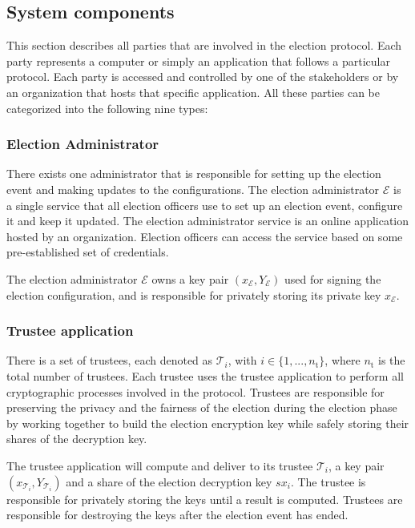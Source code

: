\subsection{System components} \label{sec: system components}
This section describes all parties that are involved in the election protocol. Each party represents a computer or simply an application that follows a particular protocol. Each party is accessed and controlled by one of the stakeholders or by an organization that hosts that specific application. All these parties can be categorized into the following nine types: 


\subsubsection{Election Administrator}
There exists one administrator that is responsible for setting up the election event and making updates to the configurations. The election administrator $\mathcal{E}$ is a single service that all election officers use to set up an election event, configure it and keep it updated. The election administrator service is an online application hosted by an organization. Election officers can access the service based on some pre-established set of credentials.

The election administrator $\mathcal{E}$ owns a key pair $(x_\mathcal{E}, Y_\mathcal{E})$ used for signing the election configuration, and is responsible for privately storing its private key $x_\mathcal{E}$.


\subsubsection{Trustee application}
There is a set of trustees, each denoted as $\mathcal{T}_i$, with $i \in \{ 1, ..., n_\mathrm{t} \}$, where $n_\mathrm{t}$ is the total number of trustees. Each trustee uses the trustee application to perform all cryptographic processes involved in the protocol. Trustees are responsible for preserving the privacy and the fairness of the election during the election phase by working together to build the election encryption key while safely storing their shares of the decryption key.

The trustee application will compute and deliver to its trustee $\mathcal{T}_i$, a key pair $(x_{\mathcal{T}_i}, Y_{\mathcal{T}_i})$ and a share of the election decryption key $sx_i$. The trustee is responsible for privately storing the keys until a result is computed. Trustees are responsible for destroying the keys after the election event has ended.


